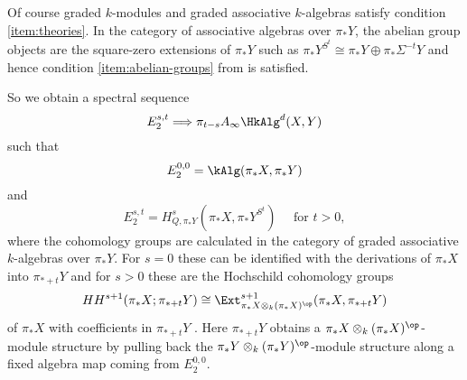 \documentclass[leqno,oneside,english]{elsarticle}
\begin{document}
Of course graded $k$-modules and graded associative $k$-algebras satisfy
condition \eqref{item:theories}.  In the category of associative
algebras over $\pi_* Y$, the abelian group objects are the square-zero
extensions of $\pi_* Y$ such as $\pi_*Y^{S^t}\cong \pi_* Y\oplus
\pi_*\Sigma^{-t}Y$ and hence condition \eqref{item:abelian-groups} from
 is satisfied.

So we obtain a spectral sequence 
\[ 
E_2^{s,t} \Longrightarrow
\pi_{t-s}
A_{\infty}\HkAlg^d(X,Y)
\]  
such that 
\[
E_2^{0,0}=\kAlg(\pi_*X,\pi_*Y)
\] 
and 
\[
E_2^{s,t}=H^{s}_{Q,\pi_*Y}(\pi_*X, \pi_*Y^{S^t}) \quad \text{ for } t>0,
\] 
where the cohomology groups are calculated in the category of graded
associative $k$-algebras over $\pi_*Y$. For $s=0$ these can be
identified with the derivations of $\pi_* X$ into $\pi_{*+t}Y$ \cite[\S 18]{Rez97} and for
$s>0$ these are the Hochschild cohomology groups
\[ 
HH^{s+1}(\pi_* X;\pi_{*+t}Y)\cong 
\Ext^{s+1}_{\pi_* X\otimes_{k}(\pi_*X)^{\op}}(\pi_* X, \pi_{*+t}Y)
\] 
of $\pi_* X$ with coefficients in $\pi_{*+t}Y$ \cite[Prop.~3.6]{Qui70}. Here $\pi_{*+t}Y$ obtains  a $\pi_*X\otimes_k (\pi_*X)^\op$-module structure by pulling back the $\pi_*Y\otimes_k (\pi_*Y)^\op$-module structure along a fixed algebra map coming from $E_2^{0,0}$.
\end{document}
